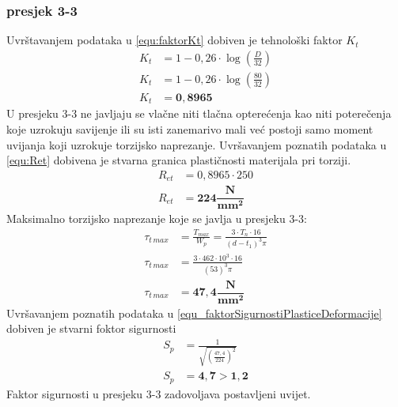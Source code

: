 \documentclass[11pt,a4paper]{report}
\begin{document}
\subsubsection{presjek 3-3}
Uvrštavanjem podataka u \eqref{equ:faktorKt} dobiven je tehnološki faktor $K_t$
\begin{align*}
K_t&=1-0,26\cdot \log \left( \frac{D}{32} \right)\\
K_t&=1-0,26\cdot \log \left( \frac{80}{32} \right)\\
K_t&=\mathbf{0,8965}
\end{align*}
U presjeku 3-3 ne javljaju se vlačne niti tlačna opterećenja kao niti poterečenja koje uzrokuju savijenje ili su isti zanemarivo mali već postoji samo moment uvijanja koji uzrokuje torzijsko naprezanje.
Uvršavanjem poznatih podataka u \eqref{equ:Ret} dobivena je stvarna granica plastičnosti materijala pri torziji.
\begin{align*}
R_{et}&=0,8965 \cdot 250\\
R_{et}&=\mathbf{224 \dfrac{N}{mm^2}}
\end{align*}
Maksimalno torzijsko naprezanje koje se javlja u presjeku 3-3:
\begin{align*}
\tau_{t \, max}&=\frac{T_{max}}{W_p}=\frac{3 \cdot T_n \cdot 16}{(d-t_1)^3 \pi}\\
\tau_{t \, max}&=\frac{3 \cdot 462\cdot 10^3 \cdot 16}{(53)^3 \pi}\\
\tau_{t \, max}&=\mathbf{47,4 \dfrac{N}{mm^2}}
\end{align*}
Uvršavanjem poznatih podataka u \eqref{equ_faktorSigurnostiPlasticeDeformacije} dobiven je stvarni foktor sigurnosti
\begin{align*}
S_p&=\frac{1}{\sqrt{\left(\frac{47,4}{224}\right)^2}}\\
S_p&=\mathbf{4,7 > 1,2}
\end{align*}
Faktor sigurnosti u presjeku 3-3 zadovoljava postavljeni uvijet.
\end{document}
